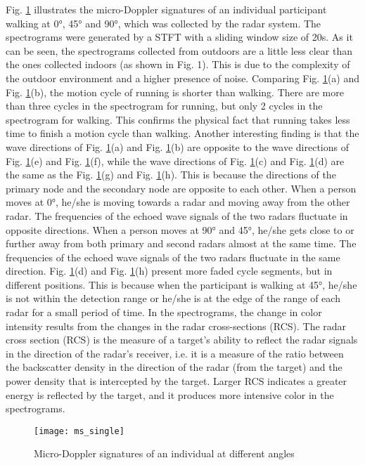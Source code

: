 Fig. \ref{fig_mss} illustrates the micro-Doppler signatures of an individual participant walking at \ang{0}, \ang{45} and \ang{90}, which was collected by the radar system. The spectrograms were generated by a STFT with a sliding window size of 20s. As it can be seen, the spectrograms collected from outdoors are a little less clear than the ones collected indoors (as shown in Fig. 1). This is due to the complexity of the outdoor environment and a higher presence of noise. Comparing Fig. \ref{fig_mss}(a) and Fig. \ref{fig_mss}(b), the motion cycle of running is shorter than walking. There are more than three cycles in the spectrogram for running, but only 2 cycles in the spectrogram for walking. This confirms the physical fact that running takes less time to finish a motion cycle than walking. Another interesting finding is that the wave directions of Fig. \ref{fig_mss}(a) and Fig. \ref{fig_mss}(b) are opposite to the wave directions of Fig. \ref{fig_mss}(e) and Fig. \ref{fig_mss}(f), while the wave directions of Fig. \ref{fig_mss}(c) and Fig. \ref{fig_mss}(d) are the same as the Fig. \ref{fig_mss}(g) and Fig. \ref{fig_mss}(h). This is because the directions of the primary node and the secondary node are opposite to each other. When a person moves at \ang{0}, he/she is moving towards a radar and moving away from the other radar. The frequencies of the echoed wave signals of the two radars fluctuate in opposite directions. When a person moves at \ang{90} and \ang{45}, he/she gets close to or further away from both primary and second radars almost at the same time. The frequencies of the echoed wave signals of the two radars fluctuate in the same direction. Fig. \ref{fig_mss}(d) and Fig. \ref{fig_mss}(h) present more faded cycle segments, but in different positions. This is because when the participant is walking at \ang{45}, he/she is not within the detection range or he/she is at the edge of the range of each radar for a small period of time. In the spectrograms, the change in color intensity results from the changes in the radar cross-sections (RCS). The radar cross section (RCS) is the measure of a target's ability to reflect the radar signals in the direction of the radar's receiver, i.e. it is a measure of the ratio between the backscatter density in the direction of the radar (from the target) and the power density that is intercepted by the target. Larger RCS indicates a greater energy is reflected by the target, and it produces more intensive color in the spectrograms.
\begin{figure}[!t]
\centering
\texttt{[image: ms\_single]}
\caption{Micro-Doppler signatures of an individual at different angles}
\label{fig_mss}
\end{figure}

